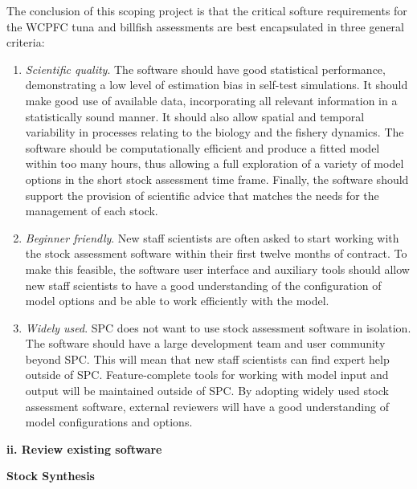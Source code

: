 \documentclass{SCreport}
\begin{document}
The conclusion of this scoping project is that the critical softure requirements
for the WCPFC tuna and billfish assessments are best encapsulated in three
general criteria:

\begin{enumerate}
  \item \textit{Scientific quality}. The software should have good statistical
  performance, demonstrating a low level of estimation bias in self-test
  simulations. It should make good use of available data, incorporating all
  relevant information in a statistically sound manner. It should also allow
  spatial and temporal variability in processes relating to the biology and the
  fishery dynamics. The software should be computationally efficient and produce
  a fitted model within too many hours, thus allowing a full exploration of a
  variety of model options in the short stock assessment time frame. Finally,
  the software should support the provision of scientific advice that matches
  the needs for the management of each stock.
  \item \textit{Beginner friendly}. New staff scientists are often asked to
  start working with the stock assessment software within their first twelve
  months of contract. To make this feasible, the software user interface and
  auxiliary tools should allow new staff scientists to have a good understanding
  of the configuration of model options and be able to work efficiently with the
  model.
  \item \textit{Widely used}. SPC does not want to use stock assessment software
  in isolation. The software should have a large development team and user
  community beyond SPC. This will mean that new staff scientists can find expert
  help outside of SPC. Feature-complete tools for working with model input and
  output will be maintained outside of SPC. By adopting widely used stock
  assessment software, external reviewers will have a good understanding of
  model configurations and options.
\end{enumerate}

\vspace{1ex}

\textbf{ii. Review existing software}

\textbf{Stock Synthesis}

\vspace{-1ex}
\end{document}
